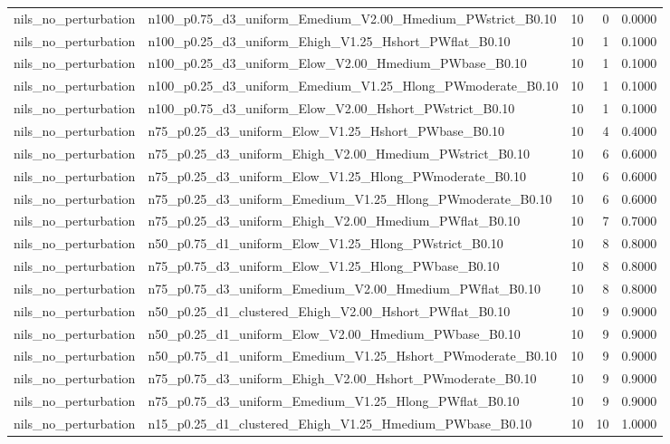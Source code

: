 \begin{tabular}{llrrr}
nils_no_perturbation & n100_p0.75_d3_uniform_Emedium_V2.00_Hmedium_PWstrict_B0.10 & 10 & 0 & 0.0000 \\
nils_no_perturbation & n100_p0.25_d3_uniform_Ehigh_V1.25_Hshort_PWflat_B0.10 & 10 & 1 & 0.1000 \\
nils_no_perturbation & n100_p0.25_d3_uniform_Elow_V2.00_Hmedium_PWbase_B0.10 & 10 & 1 & 0.1000 \\
nils_no_perturbation & n100_p0.25_d3_uniform_Emedium_V1.25_Hlong_PWmoderate_B0.10 & 10 & 1 & 0.1000 \\
nils_no_perturbation & n100_p0.75_d3_uniform_Elow_V2.00_Hshort_PWstrict_B0.10 & 10 & 1 & 0.1000 \\
nils_no_perturbation & n75_p0.25_d3_uniform_Elow_V1.25_Hshort_PWbase_B0.10 & 10 & 4 & 0.4000 \\
nils_no_perturbation & n75_p0.25_d3_uniform_Ehigh_V2.00_Hmedium_PWstrict_B0.10 & 10 & 6 & 0.6000 \\
nils_no_perturbation & n75_p0.25_d3_uniform_Elow_V1.25_Hlong_PWmoderate_B0.10 & 10 & 6 & 0.6000 \\
nils_no_perturbation & n75_p0.25_d3_uniform_Emedium_V1.25_Hlong_PWmoderate_B0.10 & 10 & 6 & 0.6000 \\
nils_no_perturbation & n75_p0.25_d3_uniform_Ehigh_V2.00_Hmedium_PWflat_B0.10 & 10 & 7 & 0.7000 \\
nils_no_perturbation & n50_p0.75_d1_uniform_Elow_V1.25_Hlong_PWstrict_B0.10 & 10 & 8 & 0.8000 \\
nils_no_perturbation & n75_p0.75_d3_uniform_Elow_V1.25_Hlong_PWbase_B0.10 & 10 & 8 & 0.8000 \\
nils_no_perturbation & n75_p0.75_d3_uniform_Emedium_V2.00_Hmedium_PWflat_B0.10 & 10 & 8 & 0.8000 \\
nils_no_perturbation & n50_p0.25_d1_clustered_Ehigh_V2.00_Hshort_PWflat_B0.10 & 10 & 9 & 0.9000 \\
nils_no_perturbation & n50_p0.25_d1_uniform_Elow_V2.00_Hmedium_PWbase_B0.10 & 10 & 9 & 0.9000 \\
nils_no_perturbation & n50_p0.75_d1_uniform_Emedium_V1.25_Hshort_PWmoderate_B0.10 & 10 & 9 & 0.9000 \\
nils_no_perturbation & n75_p0.75_d3_uniform_Ehigh_V2.00_Hshort_PWmoderate_B0.10 & 10 & 9 & 0.9000 \\
nils_no_perturbation & n75_p0.75_d3_uniform_Emedium_V1.25_Hlong_PWflat_B0.10 & 10 & 9 & 0.9000 \\
nils_no_perturbation & n15_p0.25_d1_clustered_Ehigh_V1.25_Hmedium_PWbase_B0.10 & 10 & 10 & 1.0000 \\

\end{tabular}
